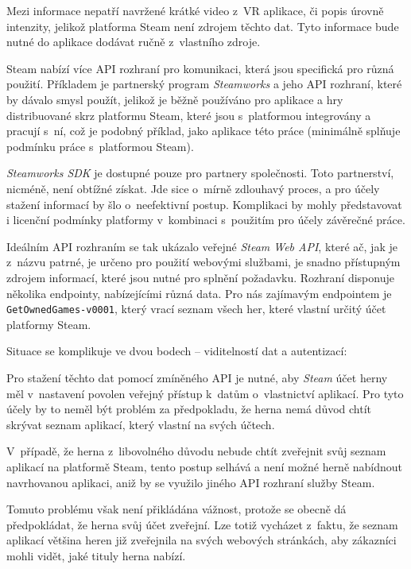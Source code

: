 Mezi informace nepatří navržené krátké video z~VR aplikace, či popis úrovně
intenzity, jelikož platforma Steam není zdrojem těchto dat. Tyto
informace bude nutné do aplikace dodávat ručně z~vlastního zdroje.

Steam nabízí více API rozhraní pro komunikaci, která jsou specifická pro různá
použití. Příkladem je partnerský program \emph{Steamworks} a jeho API rozhraní, 
které by dávalo smysl použít, jelikož je
běžně používáno pro aplikace a hry distribuované skrz platformu Steam,
které jsou s~platformou integrovány a pracují s~ní, což je podobný příklad, jako aplikace této práce (minimálně splňuje podmínku práce
s~platformou Steam). \autocite{steamworks}

\emph{Steamworks SDK} \autocite{steamworks} je dostupné pouze pro
partnery společnosti. Toto partnerství, nicméně, není obtížné získat.
Jde sice o~mírně zdlouhavý proces, a pro účely stažení informací by šlo
o~neefektivní postup. Komplikaci by mohly představovat i licenční podmínky
platformy v~kombinaci s~použitím pro účely závěrečné práce.

Ideálním API rozhraním se tak ukázalo veřejné \emph{Steam Web API},
které ač, jak je z~názvu patrné, je určeno pro použití webovými
službami, je snadno přístupným zdrojem informací, které jsou
nutné pro splnění požadavku. \autocite{steamwebapi} Rozhraní disponuje několika endpointy,
nabízejícími různá data. Pro nás zajímavým endpointem je
\texttt{GetOwnedGames-v0001}, který vrací seznam všech her, které
vlastní určitý účet platformy Steam.

Situace se komplikuje ve dvou bodech -- viditelností dat a
autentizací:

Pro stažení těchto dat pomocí zmíněného API je nutné, aby \emph{Steam} 
účet herny měl v~nastavení povolen veřejný přístup
k~datům o~vlastnictví aplikací. Pro tyto účely by to neměl být problém za
předpokladu, že herna nemá důvod chtít skrývat seznam aplikací, který vlastní
na svých účtech. 

V~případě, že herna z~libovolného důvodu nebude chtít
zveřejnit svůj seznam aplikací na platformě Steam, tento postup  selhává a
není možné herně nabídnout navrhovanou aplikaci, aniž by se využilo
jiného API rozhraní služby Steam. 

Tomuto problému však není přikládána
vážnost, protože se obecně dá předpokládat, že herna svůj účet zveřejní.
Lze totiž vycházet z~faktu, že seznam aplikací většina heren již zveřejnila
na svých webových stránkách, aby zákazníci mohli vidět, jaké tituly
herna nabízí.


